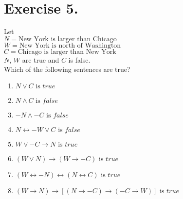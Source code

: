 \documentclass{article}
\begin{document}
\section*{Exercise 5.}
Let\\
$N = \text{New York is larger than Chicago}$\\
$W = \text{New York is north of Washington}$\\
$C = \text{Chicago is larger than New York}$\\
$N$, $W$ are true and $C$ is false.\\
Which of the following sentences are true?
\medskip
\begin{enumerate}[label=(\alph*)]
\item $N \vee C \text{ is } true$
\item $N \wedge C \text{ is } false$
\item $-N \wedge -C \text{ is } false$
\item $N \leftrightarrow -W \vee C \text{ is } false$
\item $W \vee -C \rightarrow N \text{ is } true$
\item $(W \vee N) \rightarrow (W \rightarrow -C) \text{ is } true$
\item $(W \leftrightarrow -N) \leftrightarrow (N \leftrightarrow C) \text{ is } true$
\item $(W \rightarrow N) \rightarrow [(N \rightarrow -C) \rightarrow (-C \rightarrow W)] \text{ is } true$
\end{enumerate}
\end{document}
